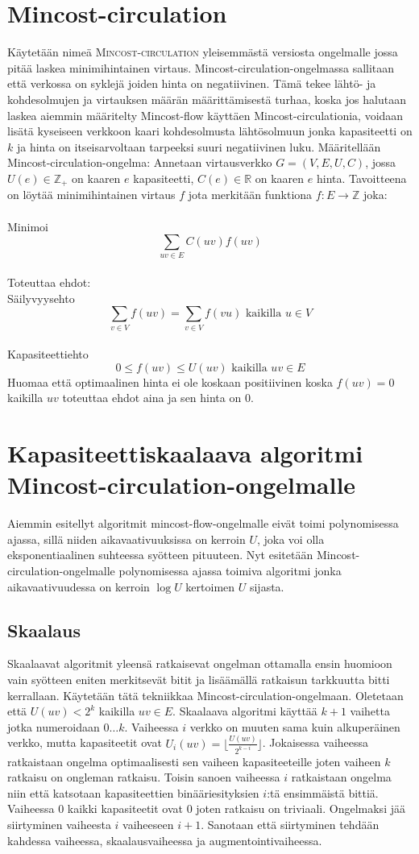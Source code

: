 \documentclass[a4paper, 11pt]{article}
\begin{document}
\section*{Mincost-circulation}
Käytetään nimeä \textsc{Mincost-circulation} yleisemmästä versiosta ongelmalle jossa pitää
laskea minimihintainen virtaus. Mincost-circulation-ongelmassa sallitaan että
verkossa on syklejä joiden hinta on negatiivinen. Tämä tekee lähtö- ja kohdesolmujen
ja virtauksen määrän määrittämisestä turhaa, koska jos halutaan laskea aiemmin määritelty
Mincost-flow käyttäen Mincost-circulationia, voidaan lisätä kyseiseen verkkoon kaari 
kohdesolmusta lähtösolmuun jonka kapasiteetti on $k$ ja hinta on itseisarvoltaan
tarpeeksi suuri negatiivinen luku. Määritellään Mincost-circulation-ongelma: 
Annetaan virtausverkko $G = (V, E, U, C)$, jossa $U(e) \in \mathbb{Z_+}$ on 
kaaren $e$ kapasiteetti, $C(e) \in \mathbb{R}$ on kaaren $e$ hinta. Tavoitteena on löytää minimihintainen virtaus
$f$ jota merkitään funktiona
$f : E \rightarrow \mathbb{Z}$ joka: \\\\ Minimoi $$\sum_{uv \in E} C(uv) f(uv)$$\\
Toteuttaa ehdot:\\ Säilyvyysehto
$$\sum_{v \in V} f(uv) = \sum_{v \in V} f(vu) \text{ kaikilla } u \in V$$
\\Kapasiteettiehto
$$0 \le f(uv) \le U(uv) \text{ kaikilla } uv \in E$$
Huomaa että optimaalinen hinta ei ole koskaan positiivinen koska $f(uv) = 0$ kaikilla
$uv$ toteuttaa ehdot aina ja sen hinta on $0$.
\section*{Kapasiteettiskaalaava algoritmi Mincost-circulation-ongelmalle}
Aiemmin esitellyt algoritmit mincost-flow-ongelmalle eivät toimi polynomisessa ajassa,
sillä niiden aikavaativuuksissa on kerroin $U$, joka voi olla eksponentiaalinen suhteessa
syötteen pituuteen. Nyt esitetään Mincost-circulation-ongelmalle polynomisessa ajassa toimiva
algoritmi jonka aikavaativuudessa on kerroin $\log U$ kertoimen $U$ sijasta.
\subsection*{Skaalaus}
Skaalaavat algoritmit yleensä ratkaisevat ongelman ottamalla ensin huomioon vain syötteen
eniten merkitsevät bitit ja lisäämällä ratkaisun tarkkuutta bitti kerrallaan. Käytetään
tätä tekniikkaa Mincost-circulation-ongelmaan. Oletetaan että $U(uv) < 2^k$ kaikilla $uv \in E$.
Skaalaava algoritmi käyttää $k+1$ vaihetta jotka numeroidaan $0 \ldots k$. Vaiheessa 
$i$ verkko on muuten sama kuin 
alkuperäinen verkko, mutta kapasiteetit ovat $U_i(uv) = \lfloor \frac{U(uv)}{2^{k-i}} \rfloor$.
Jokaisessa vaiheessa ratkaistaan ongelma optimaalisesti sen vaiheen kapasiteeteille joten vaiheen
$k$ ratkaisu on ongleman ratkaisu.
Toisin sanoen vaiheessa $i$ ratkaistaan ongelma niin että katsotaan kapasiteettien
binääriesityksien $i$:tä ensimmäistä bittiä. Vaiheessa $0$ kaikki kapasiteetit ovat $0$ joten
ratkaisu on triviaali. Ongelmaksi jää siirtyminen vaiheesta $i$ vaiheeseen $i+1$. Sanotaan
että siirtyminen tehdään kahdessa vaiheessa, skaalausvaiheessa ja augmentointivaiheessa.
\end{document}
